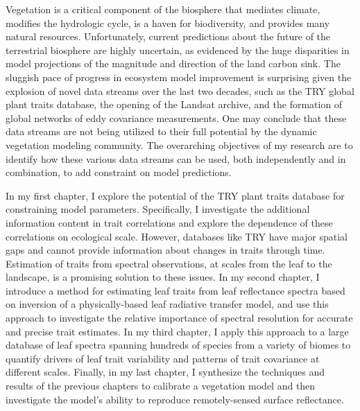 
Vegetation is a critical component of the biosphere that mediates climate, modifies the hydrologic cycle, is a haven for biodiversity, and provides many natural resources.
Unfortunately, current predictions about the future of the terrestrial biosphere are highly uncertain, as evidenced by the huge disparities in model projections of the magnitude and direction of the land carbon sink.
The sluggish pace of progress in ecosystem model improvement is surprising given the explosion of novel data streams over the last two decades, such as the TRY global plant traits database, the opening of the Landsat archive, and the formation of global networks of eddy covariance measurements.
One may conclude that these data streams are not being utilized to their full potential by the dynamic vegetation modeling community.
The overarching objectives of my research are to identify how these various data streams can be used, both independently and in combination, to add constraint on model predictions.

In my first chapter, I explore the potential of the TRY plant traits database for constraining model parameters.
Specifically, I investigate the additional information content in trait correlations and explore the dependence of these correlations on ecological scale.
However, databases like TRY have major spatial gaps and cannot provide information about changes in traits through time.
Estimation of traits from spectral observations, at scales from the leaf to the landscape, is a promising solution to these issues.
In my second chapter, I introduce a method for estimating leaf traits from leaf reflectance spectra based on inversion of a physically-based leaf radiative transfer model, and use this approach to investigate the relative importance of spectral resolution for accurate and precise trait estimates.
In my third chapter, I apply this approach to a large database of leaf spectra spanning hundreds of species from a variety of biomes to quantify drivers of leaf trait variability and patterns of trait covariance at different scales.
Finally, in my last chapter, I synthesize the techniques and results of the previous chapters to calibrate a vegetation model and then investigate the model's ability to reproduce remotely-sensed surface reflectance.
